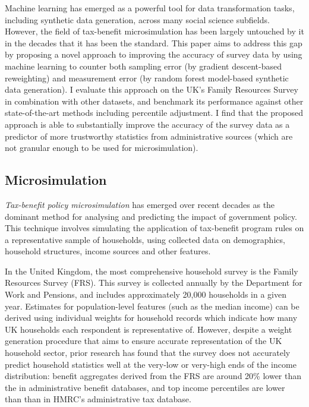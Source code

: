 \documentclass[10pt,journal,compsoc]{IEEEtran}
\begin{document}
Machine learning has emerged as a powerful tool for data transformation tasks, including synthetic data generation, across many social science subfields. However, the field of tax-benefit microsimulation has been largely untouched by it in the decades that it has been the standard. This paper aims to address this gap by proposing a novel approach to improving the accuracy of survey data by using machine learning to counter both sampling error (by gradient descent-based reweighting) and measurement error (by random forest model-based synthetic data generation). I evaluate this approach on the UK's Family Resources Survey in combination with other datasets, and benchmark its performance against other state-of-the-art methods including percentile adjustment. I find that the proposed approach is able to substantially improve the accuracy of the survey data as a predictor of more trustworthy statistics from administrative sources (which are not granular enough to be used for microsimulation).

\subsection{Microsimulation}

\emph{Tax-benefit policy microsimulation} has emerged over recent decades as the dominant method for analysing and predicting the impact of government policy. This technique involves simulating the application of tax-benefit program rules on a representative sample of households, using collected data on demographics, household structures, income sources and other features.

In the United Kingdom, the most comprehensive household survey is the Family Resources Survey (FRS). This survey is collected annually by the Department for Work and Pensions, and includes approximately 20,000 households in a given year. Estimates for population-level features (such as the median income) can be derived using individual weights for household records which indicate how many UK households each respondent is representative of. However, despite a weight generation procedure that aims to ensure accurate representation of the UK household sector, prior research has found that the survey does not accurately predict household statistics well at the very-low or very-high ends of the income distribution: benefit aggregates derived from the FRS are around 20\% lower than the in administrative benefit databases, and top income percentiles are lower than than in HMRC's administrative tax database.
\end{document}
